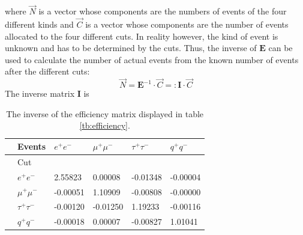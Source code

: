 where $\vec{N}$ is a vector whose components are the numbers of events of the four different kinds and $\vec{C}$ is a vector whose components are the number of events allocated to the four different cuts. 
In reality however, the kind of event is unknown and has to be determined by the cuts. Thus, the inverse of $\boldsymbol{E}$ can be used to calculate the number of actual events from the known number of events after the different cuts:
\begin{equation}
\vec{N}=\boldsymbol{E}^{-1}\cdot\vec{C}=:\boldsymbol{I}\cdot\vec{C}
\label{eq:numberevents}
\end{equation} 
The inverse matrix $\boldsymbol{I}$ is
\begin{table}[H]\centering
	\begin{tabular}{@{}llllll@{}}
		\toprule
		&Events &$e^+e^-$&$\mu^+\mu^-$&$\tau^+\tau^-$&$q^+q^-$\\
		\midrule
		&Cut&&&&\\
		&$e^+e^-$&2.55823&0.00008&-0.01348&-0.00004\\
		&$\mu^+\mu^-$&-0.00051&1.10909&-0.00808&-0.00000\\
		&$\tau^+\tau^-$&-0.00120&-0.01250&1.19233&-0.00116\\
		&$q^+q^-$&-0.00018&0.00007&-0.00827&1.01041\\
		\bottomrule
	\end{tabular}
	\caption[Inverse efficiency matrix]{The inverse of the efficiency matrix displayed in table \ref{tb:efficiency}.}
	\label{tb:invefficiency}
\end{table}

